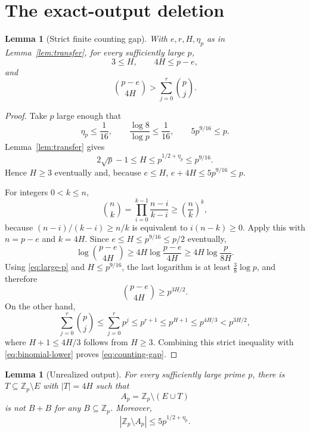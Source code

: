 \documentclass[11pt]{article}
\newtheorem{lemma}[theorem]{Lemma}
\theoremstyle{definition}
\newcommand{\Zp}{\mathbb Z_p}
\begin{document}
\section{The exact-output deletion}

\begin{lemma}[Strict finite counting gap]\label{lem:count}
With $e,r,H,\eta_p$ as in Lemma~\ref{lem:transfer}, for every sufficiently
large $p$,
\[
  3\le H,\qquad 4H\le p-e,
\]
and
\[
  \binom{p-e}{4H}>\sum_{j=0}^{r}\binom pj.          \label{eq:counting-gap}
\]
\end{lemma}

\begin{proof}
Take $p$ large enough that
\[
 \eta_p\le\frac1{16},\qquad
 \frac{\log8}{\log p}\le\frac1{16},\qquad
 5p^{9/16}\le p.                                  \label{eq:large-p}
\]
Lemma~\ref{lem:transfer} gives
\[
 2\sqrt p-1\le H\le p^{1/2+\eta_p}\le p^{9/16}.
\]
Hence $H\ge3$ eventually and, because $e\le H$,
$e+4H\le5p^{9/16}\le p$.

For integers $0<k\le n$,
\[
 \binom nk=\prod_{i=0}^{k-1}\frac{n-i}{k-i}
 \ge\left(\frac nk\right)^k,
\]
because $(n-i)/(k-i)\ge n/k$ is equivalent to $i(n-k)\ge0$.
Apply this with $n=p-e$ and $k=4H$.  Since $e\le H\le p^{9/16}\le p/2$
eventually,
\[
 \log\binom{p-e}{4H}
 \ge4H\log\frac{p-e}{4H}
 \ge4H\log\frac p{8H}.
\]
Using \eqref{eq:large-p} and $H\le p^{9/16}$, the last logarithm is at least
$\frac38\log p$, and therefore
\[
 \binom{p-e}{4H}\ge p^{3H/2}.                    \label{eq:binomial-lower}
\]
On the other hand,
\[
 \sum_{j=0}^{r}\binom pj
 \le\sum_{j=0}^{r}p^j
 \le p^{r+1}\le p^{H+1}\le p^{4H/3}<p^{3H/2},
\]
where $H+1\le4H/3$ follows from $H\ge3$.  Combining this strict inequality
with \eqref{eq:binomial-lower} proves \eqref{eq:counting-gap}.
\end{proof}

\begin{lemma}[Unrealized output]\label{lem:deletion}
For every sufficiently large prime $p$, there is $T\subseteq\Zp\setminus E$
with $|T|=4H$ such that
\[
 A_p=\Zp\setminus(E\cup T)
\]
is not $B+B$ for any $B\subseteq\Zp$.  Moreover,
\[
 |\Zp\setminus A_p|\le5p^{1/2+\eta_p}.
\]
\end{lemma}
\end{document}
